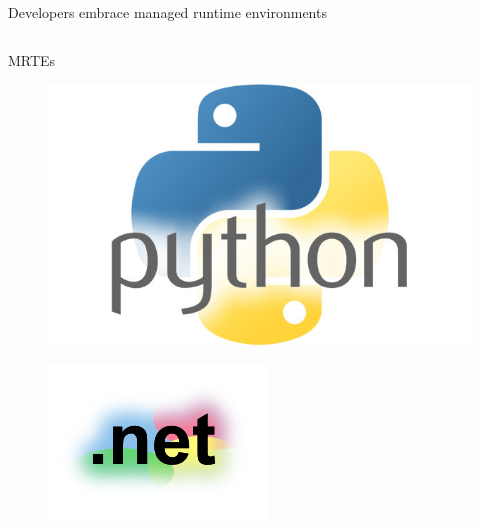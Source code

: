 \documentclass[10pt,xcolor={dvipsnames}]{beamer}
\begin{document}
\begin{frame}{Developers embrace managed runtime environments}
\begin{columns}
\begin{exampleblock}{MRTEs}
\begin{figure}
				\end{figure}
				\vspace{-.5cm}
				\begin{figure}
					\includegraphics[scale=0.07]{fig/python.jpg}
				\end{figure}
				\vspace{-.5cm}
				\begin{figure}
					\includegraphics[scale=0.17]{fig/dotnet.png}
				\end{figure}
			\end{exampleblock}
		\end{columns}
	\end{frame}
	
\end{document}
